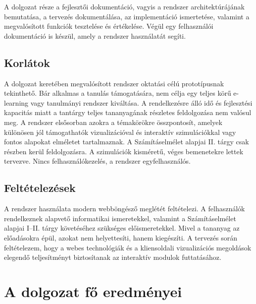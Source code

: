 
A dolgozat része a fejlesztői dokumentáció, vagyis
a rendszer architektúrájának bemutatása, a tervezés
dokumentálása, az implementáció ismertetése, valamint a megvalósított
funkciók tesztelése és értékelése. Végül egy felhasználói dokumentáció
is készül, amely a rendszer használatát segíti.

\subsection{Korlátok}

A dolgozat keretében megvalósított rendszer oktatási célú
prototípusnak tekinthető. Bár alkalmas a tanulás támogatására, nem
célja egy teljes körű e-learning vagy tanulmányi rendszer kiváltása.
A rendelkezésre álló idő és fejlesztési kapacitás miatt a tantárgy teljes
 tananyagának részletes feldolgozása nem valósul meg. 
 A rendszer elsősorban azokra a témakörökre összpontosít, amelyek különösen jól támogathatók vizualizációval
  és interaktív szimulációkkal vagy fontos alapokat elméletet tartalmaznak.
A Számításelmélet alapjai II. tárgy csak részben kerül feldolgozásra.
A szimulációk kisméretű, véges bemenetekre lettek tervezve.
Nincs felhasználókezelés, a rendszer egyfelhasználós.

\clearpage
\subsection{Feltételezések}

A rendszer használata modern webböngésző meglétét feltételezi. A
felhasználók rendelkeznek alapvető informatikai ismeretekkel, valamint
a Számításelmélet alapjai I--II. tárgy követéséhez szükséges
előismeretekkel. Mivel a tananyag az előadásokra épül, azokat nem
helyettesíti, hanem kiegészíti. A tervezés során feltételezem, hogy a webes
technológiák és a kliensoldali vizualizációs megoldások elegendő
teljesítményt biztosítanak az interaktív modulok futtatásához.

\section{A dolgozat fő eredményei}

